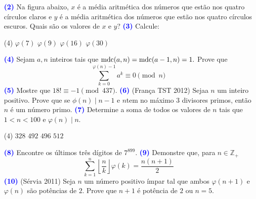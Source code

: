 \documentclass[12pt, a4paper]{article}
\newcommand{\mdc}{{\rm mdc}}
\newcommand{\negrito}[1]{\mbox{\boldmath{$#1$}}}
\begin{document}
\textcolor{blue}{\bf(2)} Na figura abaixo, $x$ é a média aritmética dos números que estão nos quatro círculos claros e $y$ é a média aritmética dos números que estão nos quatro círculos escuros. Quais são os valores de $x$ e $y$?
\textcolor{blue}{\bf(3)} Calcule:
\begin{tasks}[counter-format={(tsk[a])},label-width=3.6ex, label-format = {\bfseries}, column-sep = {0pt}](4)
\task[\textcolor{Floresta}{$\negrito{(a)} $}] $\varphi(7)$
\task[\textcolor{Floresta}{$\negrito{(b)} $}] $\varphi(9)$
\task[\textcolor{Floresta}{$\negrito{(c)} $}] $\varphi(16)$
\task[\textcolor{Floresta}{$\negrito{(d)} $}] $\varphi(30)$
\end{tasks}
\textcolor{blue}{\bf(4)} Sejam $a, n$ inteiros tais que $\mdc(a,n) = \mdc(a-1, n) = 1.$ Prove que
\[ \sum\limits_{k = 0}^{\varphi(n)-1} a^k \equiv 0 \pmod n\]
\textcolor{blue}{\bf(5)} Mostre que $18! \equiv -1 \pmod{437}.$
\newline
\newline
\textcolor{blue}{\bf(6)} (França TST 2012) Sejaa $n$ um inteiro positivo. Prove que se $\phi (n) \mid n-1$ e $n$tem no máximo $3$ divisores primos, então $n$ é um número primo.
\newline\newline
\textcolor{blue}{\bf(7)} Determine a soma de todos os valores de $n$ tais que $1 < n < 100$ e $\varphi(n) \mid n.$
\begin{tasks}[counter-format={(tsk[a])},label-width=3.6ex, label-format = {\bfseries}, column-sep = {0pt}](4)
\task[\textcolor{Floresta}{$\negrito{(a)} $}] $328$
\task[\textcolor{Floresta}{$\negrito{(b)} $}] $492$
\task[\textcolor{Floresta}{$\negrito{(c)} $}] $496$
\task[\textcolor{Floresta}{$\negrito{(d)} $}] $512$
\end{tasks}
\textcolor{blue}{\bf(8)} Encontre os últimos três dígitos de $7^{899}.$
\newline
\newline
\textcolor{blue}{\bf(9)} Demonstre que, para $n\in \mathbb{Z}_+$ \[ \sum\limits_{k=1}^n \left\lfloor\frac{n}{k}\right\rfloor\varphi(k) = \frac{n(n + 1)}{2}\]
\textcolor{blue}{\bf(10)} (Sérvia 2011) Seja $ n $ um número positivo ímpar tal que ambos $ \varphi(n+1) $ e $ \varphi(n)$ são potências de $2.$ Prove que $n + 1$ é potência de $2$ ou $n = 5.$
\end{document}
